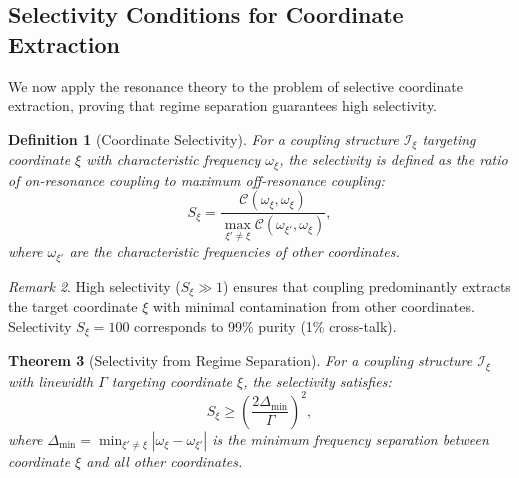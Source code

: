 \documentclass[twocolumn,10pt,a4paper]{article}
\newtheorem{theorem}{Theorem}[section]
\newtheorem{definition}[theorem]{Definition}
\theoremstyle{remark}
\newtheorem{remark}[theorem]{Remark}
\begin{document}
\subsection{Selectivity Conditions for Coordinate Extraction}

We now apply the resonance theory to the problem of selective coordinate extraction, proving that regime separation guarantees high selectivity.

\begin{definition}[Coordinate Selectivity]
\label{def:selectivity}
For a coupling structure $\mathcal{I}_\xi$ targeting coordinate $\xi$ with characteristic frequency $\omega_\xi$, the \emph{selectivity} is defined as the ratio of on-resonance coupling to maximum off-resonance coupling:
\begin{equation}
S_\xi = \frac{\mathcal{C}(\omega_\xi, \omega_\xi)}{\max_{\xi' \neq \xi} \mathcal{C}(\omega_{\xi'}, \omega_\xi)},
\end{equation}
where $\omega_{\xi'}$ are the characteristic frequencies of other coordinates.
\end{definition}

\begin{remark}
High selectivity ($S_\xi \gg 1$) ensures that coupling predominantly extracts the target coordinate $\xi$ with minimal contamination from other coordinates. Selectivity $S_\xi = 100$ corresponds to 99\% purity (1\% cross-talk).
\end{remark}

\begin{theorem}[Selectivity from Regime Separation]
\label{thm:selectivity}
For a coupling structure $\mathcal{I}_\xi$ with linewidth $\Gamma$ targeting coordinate $\xi$, the selectivity satisfies:
\begin{equation}
S_\xi \geq \left( \frac{2\Delta_{\min}}{\Gamma} \right)^2,
\end{equation}
where $\Delta_{\min} = \min_{\xi' \neq \xi} |\omega_\xi - \omega_{\xi'}|$ is the minimum frequency separation between coordinate $\xi$ and all other coordinates.
\end{theorem}
\end{document}

